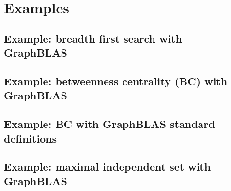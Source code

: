 \chapter{Examples}

\pagebreak
\nolinenumbers
\section{Example: breadth first search with GraphBLAS}
{\scriptsize

}

\pagebreak
\nolinenumbers
\section{Example: betweenness centrality (BC) with GraphBLAS}
{\scriptsize

}

\pagebreak
\nolinenumbers
\section{Example: BC with GraphBLAS standard definitions}
{\scriptsize

}

\pagebreak
\nolinenumbers
\section{Example: maximal independent set with GraphBLAS}
{\scriptsize

}

\pagebreak
